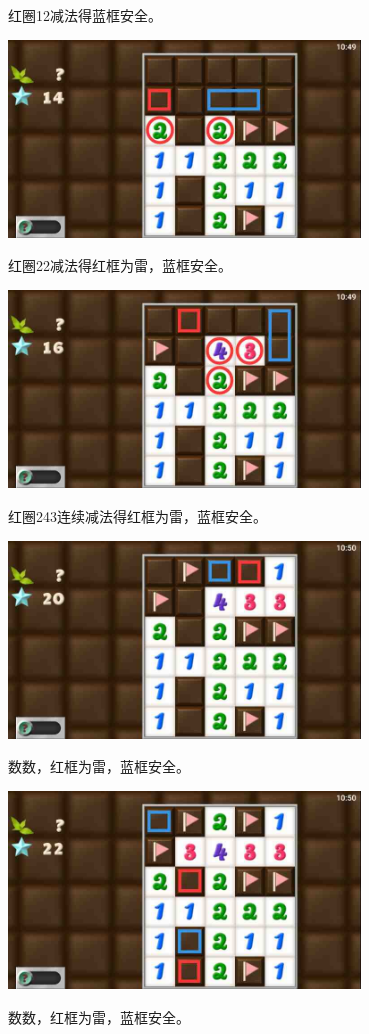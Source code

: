 红圈12减法得蓝框安全。
\begin{center}
    \includegraphics[width=0.7\textwidth]{puzzlelow/182-5.jpg}
\end{center}
红圈22减法得红框为雷，蓝框安全。
\begin{center}
    \includegraphics[width=0.7\textwidth]{puzzlelow/182-6.jpg}
\end{center}
红圈243连续减法得红框为雷，蓝框安全。
\begin{center}
    \includegraphics[width=0.7\textwidth]{puzzlelow/182-7.jpg}
\end{center}
数数，红框为雷，蓝框安全。
\begin{center}
    \includegraphics[width=0.7\textwidth]{puzzlelow/182-8.jpg}
\end{center}
数数，红框为雷，蓝框安全。


